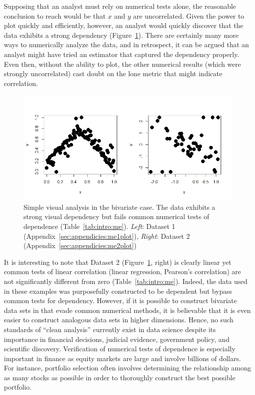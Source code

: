 Supposing that an analyst must rely on numerical tests alone, the reasonable
conclusion to reach would be that $x$ and $y$ are uncorrelated. Given the power
to plot quickly and efficiently, however, an analyst would quickly discover that
the data exhibits a strong dependency (Figure~\ref{fig:intro:meplot}). There are
certainly many more ways to numerically analyze the data, and in retrospect, it
can be argued that an analyst might have tried an estimator that captured the
dependency properly. Even then, without the ability to plot, the other
numerical results (which were strongly uncorrelated) cast doubt on the lone 
metric that might indicate correlation.

\begin{figure}[htb]
	\begin{center}
		\includegraphics[width=1\linewidth]{ch-intro/figures/me}
		\caption[Simple visual analysis in the bivariate case.]{Simple visual 
		analysis in the bivariate case. The data exhibits a strong visual 
		dependency but fails common numerical tests of dependence 
		(Table~\ref{tab:intro:me}). \textit{Left}: Dataset 1 
		(Appendix~\ref{sec:appendicies:me1plot}), \textit{Right}: Dataset 2 
		(Appendix~\ref{sec:appendicies:me2plot})}
		\label{fig:intro:meplot}
	\end{center}
\end{figure}

It is interesting to note that Dataset 2 (Figure~\ref{fig:intro:meplot}, right)
is clearly linear yet common tests of linear correlation (linear regression,
Pearson's correlation) are not significantly different from zero 
(Table~\ref{tab:intro:me}). Indeed, the data used
in these examples was purposefully constructed to be dependent but bypass common
tests for dependency. However, if it is possible to construct bivariate data 
sets in that evade common numerical methods, it is believable that
it is even easier to construct analogous data sets in higher dimensions. Hence,
no such standards of ``clean analysis'' currently exist in data science despite
its importance in financial decisions, judicial evidence, government policy, and
scientific discovery. Verification of numerical tests of dependence is 
especially important in finance as equity markets are large and involve 
billions of dollars. For instance, portfolio selection often involves 
determining the relationship among as many stocks as possible in order to 
thoroughly construct the best possible portfolio.